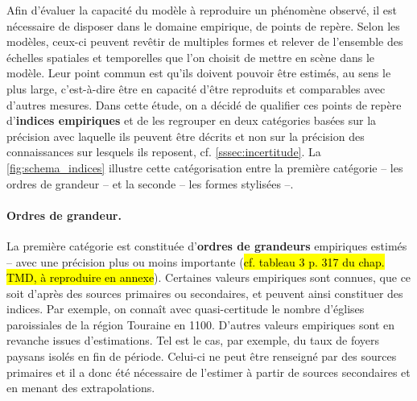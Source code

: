 Afin d'évaluer la capacité du modèle à reproduire un phénomène observé, il est nécessaire de disposer dans le domaine empirique, de \og points de repère\fg{}.
Selon les modèles, ceux-ci peuvent revêtir de multiples formes et relever de l'ensemble des échelles spatiales et temporelles que l'on choisit de mettre en scène dans le modèle.
Leur point commun est qu'ils doivent pouvoir être estimés, au sens le plus large, c'est-à-dire être en capacité d'être reproduits et comparables avec d'autres mesures.
Dans cette étude, on a décidé de qualifier ces points de repère d'\og\textbf{indices empiriques}\fg{} et de les regrouper en deux catégories basées sur la précision avec laquelle ils peuvent être décrits et non sur la précision des connaissances sur lesquels ils reposent, cf. \cref{sssec:incertitude}.
La \cref{fig:schema_indices} illustre cette catégorisation entre la première catégorie -- les ordres de grandeur -- et la seconde -- les formes stylisées --.

\paragraph{Ordres de grandeur.}
La première catégorie est constituée d'\textbf{ordres de grandeurs} empiriques estimés -- avec une précision plus ou moins importante (\hl{cf. tableau 3 p. 317 du chap. TMD, à reproduire en annexe}).
Certaines valeurs empiriques sont connues, que ce soit d'après des sources primaires ou secondaires, et peuvent ainsi constituer des indices.
Par exemple, on connaît avec quasi-certitude le nombre d'églises paroissiales de la région Touraine en 1100.
D'autres valeurs empiriques sont en revanche issues d'estimations.
Tel est le cas, par exemple, du taux de foyers paysans isolés en fin de période.
Celui-ci ne peut être renseigné par des sources primaires et il a donc été nécessaire de l'estimer à partir de sources secondaires et en menant des extrapolations.

